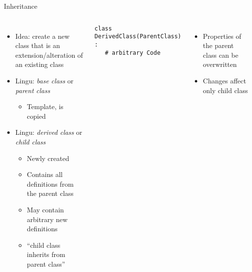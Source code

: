 
\begin{frame}[fragile]{Inheritance}
%
\begin{columns}[T]
\begin{itemize}
\item Idea: create a new class that is an extension/alteration of an existing class
\item Lingu: \emph{base class} or \emph{parent class}
	\begin{itemize}
	\item Template, is copied
	\end{itemize}
\item Lingu: \emph{derived class} or \emph{child class}
	\begin{itemize}
	\item Newly created
	\item Contains all definitions from the parent class
	\item May contain arbitrary new definitions
	\item \enquote{child class inherits from parent class}
	\end{itemize}
\end{itemize}
%
\begin{codebox}
\begin{verbatim}
class DerivedClass(ParentClass) :
   # arbitrary Code
\end{verbatim}
\end{codebox}
%
\begin{itemize}
\item Properties of the parent class can be overwritten
\item Changes affect only child class
\end{itemize}
\end{columns}
%
\end{frame}



